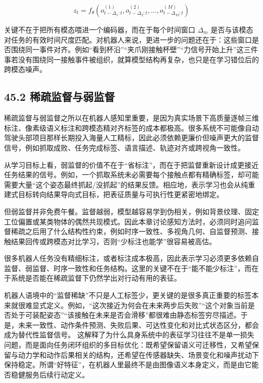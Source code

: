 \begingroup
\scriptsize
\begin{equation*}
z_t = f_\theta\left(o_{t-\Delta_1:t}^{(1)}, o_{t-\Delta_2:t}^{(2)}, \dots, o_{t-\Delta_M:t}^{(M)}\right)
\end{equation*}
\endgroup

关键不在于把所有模态喂进一个编码器，而在于每个时间窗口 \(\Delta_m\) 是否与该模态对任务的有效时间尺度匹配。对机器人来说，更进一步的问题还在于：这些窗口是否围绕同一事件对齐。例如“看到杯沿”“夹爪刚接触杯壁”“力信号开始上升”这三件事若没有围绕同一接触事件被组织，就算模型结构再复杂，也只是在学习错位后的跨模态噪声。

\subsection*{45.2 稀疏监督与弱监督}


稀疏监督与弱监督之所以在机器人感知里重要，是因为真实场景下高质量逐帧三维标注、像素级语义标注和跨模态精对齐标签的成本都极高。很多系统不可能像自动驾驶头部项目那样长期投入海量人工精标，因此必须依赖更廉价但噪声更大的监督信号，例如抓取成败、任务完成标签、语言描述、轨迹对齐或跨视角一致性。

从学习目标上看，弱监督的价值不在于“省标注”，而在于把监督重新设计成更接近任务结果的信号。例如，一个抓取系统未必需要每个接触点都有精确标签，却可能需要大量“这个姿态最终抓起/没抓起”的结果反馈。相应地，表示学习也会从纯重建式目标转向结果导向式目标，把表征质量与可执行性更紧密地绑定。

但弱监督并非免费午餐。监督越弱，模型越容易学到伪相关，例如背景纹理、固定工位偏置或某类物体的偶然共现模式。因此本章讨论感知方法时，必须同时追问监督稀疏之后用了什么结构性约束，例如时序一致性、多视角几何、自监督预测、接触结果回传或跨模态对比学习，否则“少标注也能学”很容易被高估。

很多机器人任务没有精细标注，或者标注成本极高，因此表示学习必须更多依赖自监督、弱监督、时序一致性和任务结构。这里的关键不在于“能不能少标注”，而在于系统是否能在稀疏监督下仍然学出对行动有用的表征。

机器人语境中的“监督稀缺”不只是人工标签少，更关键的是很多真正重要的标签本来就很难显式定义。例如，“这次接近为何会在未来两步后失败”“这个对象当前是否处于可装配姿态”“该接触在未来是否会滑移”都很难由静态标签穷尽描述。于是，未来一致性、动作条件预测、失败后果、可达性变化和对比式状态区分，都会成为替代性监督信号。 这解释了为什么具身系统中的表征学习往往不是单一损失问题，而是面向任务闭环组织的多目标优化：既希望保留语义可迁移性，又希望保留与动力学和动作后果相关的结构，还希望在传感器缺失、场景变化和噪声扰动下保持稳定。所谓“好特征”，在机器人里最终不是由图像语义本身定义，而是由它能否稳健服务后续行动定义。

